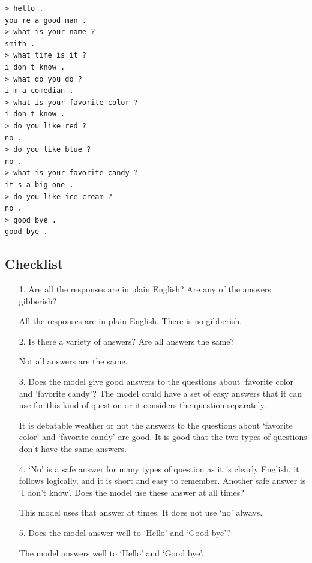 \begin{verbatim}
> hello .
you re a good man .
> what is your name ?
smith .
> what time is it ?
i don t know .
> what do you do ?
i m a comedian .
> what is your favorite color ?
i don t know .
> do you like red ?
no .
> do you like blue ?
no .
> what is your favorite candy ?
it s a big one .
> do you like ice cream ?
no .
> good bye .
good bye .
\end{verbatim}


\subsection{Checklist}

\begin{itemize}
	\item [1.] Are all the responses are in plain English? Are any of the answers gibberish?
	
	\item [] All the responses are in plain English. There is no gibberish.
	
	\item [2.] Is there a  variety of answers? Are all answers the same?
	
	\item [] Not all answers are the same.
	\item [3.] Does the model give good answers to the questions about `favorite color' and `favorite candy'? The model could have a set of easy answers that it can use for this kind of question or it considers the question separately. 
	
	\item[] It is debatable weather or not the answers to the questions about `favorite color' and `favorite candy' are good. It is good that the two types of questions don't have the same answers.
	
	\item [4.] `No' is a safe answer for many types of question as it is clearly English, it follows logically, and it is short and easy to remember. Another safe answer is `I don't know'. Does the model use these answer at all times?
	
	\item[] This model uses that answer at times. It does not use `no' always.
	
	\item [5.] Does the model answer well to `Hello' and `Good bye'?
	
	\item []The model answers well to `Hello' and `Good bye'.
\end{itemize}

